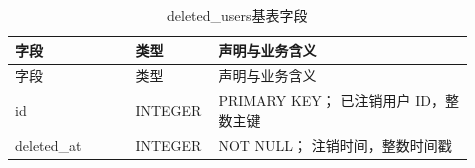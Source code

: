 \begin{longtable}{L{0.25\linewidth}L{0.13\linewidth}L{0.53\linewidth}}
\caption{deleted\_users基表字段}\label{tab:db-deleted_users}\\\toprule 字段 & 类型 & 声明与业务含义\\\midrule\endfirsthead
\toprule 字段 & 类型 & 声明与业务含义\\\midrule\endhead
id & INTEGER & PRIMARY KEY； 已注销用户 ID，整数主键\\
deleted\_at & INTEGER & NOT NULL； 注销时间，整数时间戳\\
\bottomrule\end{longtable}
